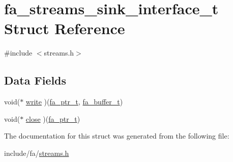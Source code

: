 \hypertarget{structfa__streams__sink__interface__t}{\section{fa\-\_\-streams\-\_\-sink\-\_\-interface\-\_\-t Struct Reference}
\label{structfa__streams__sink__interface__t}
}


{\ttfamily \#include $<$streams.\-h$>$}

\subsection*{Data Fields}
\begin{DoxyCompactItemize}
\item 
void($\ast$ \hyperlink{group___fa_ga138416e411d4b6b6396a4fb9137369eb}{write} )(\hyperlink{group___fa_ga915ddeae99ad7568b273d2b876425197}{fa\-\_\-ptr\-\_\-t}, \hyperlink{group___fa_buffer_ga0ed7a1d783ab322e2e8be02432d0839e}{fa\-\_\-buffer\-\_\-t})
\item 
void($\ast$ \hyperlink{group___fa_ga36b84e266a149be870f72436a5515dd5}{close} )(\hyperlink{group___fa_ga915ddeae99ad7568b273d2b876425197}{fa\-\_\-ptr\-\_\-t})
\end{DoxyCompactItemize}


The documentation for this struct was generated from the following file\-:\begin{DoxyCompactItemize}
\item 
include/fa/\hyperlink{streams_8h}{streams.\-h}\end{DoxyCompactItemize}
